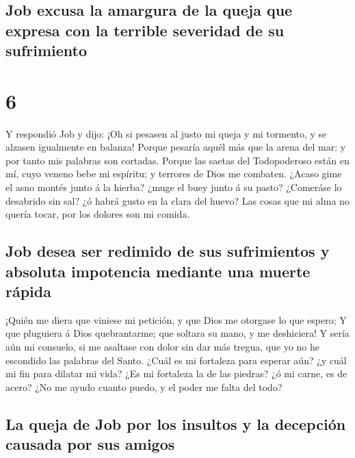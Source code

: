 \hypertarget{job-excusa-la-amargura-de-la-queja-que-expresa-con-la-terrible-severidad-de-su-sufrimiento}{%
\subsection{Job excusa la amargura de la queja que expresa con la
terrible severidad de su
sufrimiento}\label{job-excusa-la-amargura-de-la-queja-que-expresa-con-la-terrible-severidad-de-su-sufrimiento}}

\hypertarget{section-5}{%
\section{6}\label{section-5}}

 Y respondió Job y dijo:  ¡Oh si pesasen al
justo mi queja y mi tormento, y se alzasen igualmente en balanza!
 Porque pesaría aquél más que la arena del mar: y por tanto
mis palabras son cortadas.  Porque las saetas del
Todopoderoso están en mí, cuyo veneno bebe mi espíritu; y terrores de
Dios me combaten.  ¿Acaso gime el asno montés junto á la
hierba? ¿muge el buey junto á su pasto?  ¿Comeráse lo
desabrido sin sal? ¿ó habrá gusto en la clara del huevo? 
Las cosas que mi alma no quería tocar, por los dolores son mi comida.

\hypertarget{job-desea-ser-redimido-de-sus-sufrimientos-y-absoluta-impotencia-mediante-una-muerte-ruxe1pida}{%
\subsection{Job desea ser redimido de sus sufrimientos y absoluta
impotencia mediante una muerte
rápida}\label{job-desea-ser-redimido-de-sus-sufrimientos-y-absoluta-impotencia-mediante-una-muerte-ruxe1pida}}

 ¡Quién me diera que viniese mi petición, y que Dios me
otorgase lo que espero;  Y que pluguiera á Dios
quebrantarme; que soltara su mano, y me deshiciera!  Y
sería aún mi consuelo, si me asaltase con dolor sin dar más tregua, que
yo no he escondido las palabras del Santo.  ¿Cuál es mi
fortaleza para esperar aún? ¿y cuál mi fin para dilatar mi vida?
 ¿Es mi fortaleza la de las piedras? ¿ó mi carne, es de
acero?  ¿No me ayudo cuanto puedo, y el poder me falta del
todo?

\hypertarget{la-queja-de-job-por-los-insultos-y-la-decepciuxf3n-causada-por-sus-amigos}{%
\subsection{La queja de Job por los insultos y la decepción causada por
sus
amigos}\label{la-queja-de-job-por-los-insultos-y-la-decepciuxf3n-causada-por-sus-amigos}}

